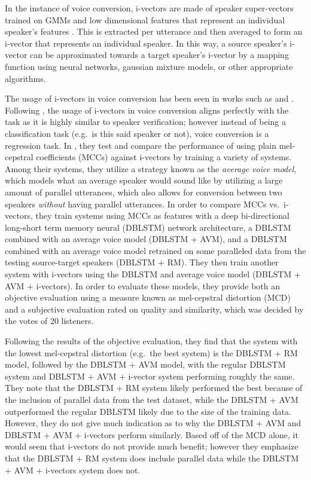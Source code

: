 \documentclass
[
    a4paper,
    twoside,
    12pt,
]
{report}
\begin{document}
In the instance of voice conversion, i-vectors are made of speaker
super-vectors trained on GMMs and low dimensional features that
represent an individual speaker's features \parencite{wu2016}. This is
extracted per utterance and then averaged to form an i-vector that
represents an individual speaker. In this way, a source speaker's
i-vector can be approximated towards a target speaker's i-vector by a
mapping function using neural networks, gaussian mixture models, or
other appropriate algorithms.

The usage of i-vectors in voice conversion has been seen in works such
as \textcite{wu2016} and \textcite{kinnunen2017}. Following
\textcite{kinnunen2017}, the usage of i-vectors in voice conversion
aligns perfectly with the task as it is highly similar to speaker
verification; however instead of being a classification task (e.g.~is
this said speaker or not), voice conversion is a regression task. In
\textcite{wu2016}, they test and compare the performance of using plain
mel-cepstral coefficients (MCCs) against i-vectors by training a variety
of systems. Among their systems, they utilize a strategy known as the
\emph{average voice model}, which models what an average speaker would
sound like by utilizing a large amount of parallel utterances, which
also allows for conversion between two speakers \emph{without} having
parallel utterances. In order to compare MCCs vs.~i-vectors, they train
systems using MCCs as features with a deep bi-directional long-short
term memory neural (DBLSTM) network architecture, a DBLSTM combined with
an average voice model (DBLSTM + AVM), and a DBLSTM combined with an
average voice model retrained on some paralleled data from the testing
source-target speakers (DBLSTM + RM). They then train another system
with i-vectors using the DBLSTM and average voice model (DBLSTM + AVM +
i-vectors). In order to evaluate these models, they provide both an
objective evaluation using a measure known as mel-cepstral distortion
(MCD) and a subjective evaluation rated on quality and similarity, which
was decided by the votes of 20 listeners.

Following the results of the objective evaluation, they find that the
system with the lowest mel-cepstral distortion (e.g.~the best system) is
the DBLSTM + RM model, followed by the DBLSTM + AVM model, with the
regular DBLSTM system and DBLSTM + AVM + i-vector system performing
roughly the same. They note that the DBLSTM + RM system likely performed
the best because of the inclusion of parallel data from the test
dataset, while the DBLSTM + AVM outperformed the regular DBLSTM likely
due to the size of the training data. However, they do not give much
indication as to why the DBLSTM + AVM and DBLSTM + AVM + i-vectors
perform similarly. Based off of the MCD alone, it would seem that
i-vectors do not provide much benefit; however they emphasize that the
DBLSTM + RM system does include parallel data while the DBLSTM + AVM +
i-vectors system does not.
\end{document}
